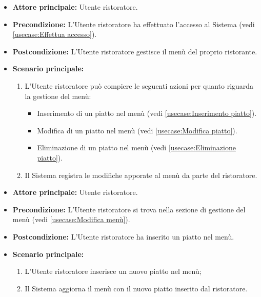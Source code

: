 \label{usecase:Modifica menù}
\begin{itemize}
	\item \textbf{Attore principale:} Utente ristoratore.

	\item \textbf{Precondizione:} L'Utente ristoratore ha effettuato l'accesso al Sistema (vedi \autoref{usecase:Effettua accesso}).

	\item \textbf{Postcondizione:} L'Utente ristoratore gestisce il menù del proprio ristorante.


	\item \textbf{Scenario principale:}
	      \begin{enumerate}

		      \item L'Utente ristoratore può compiere le seguenti azioni per quanto riguarda la gestione del menù:
		      \begin{itemize}
                \item Inserimento di un piatto nel menù (vedi \autoref{usecase:Inserimento piatto}).
                \item Modifica di un piatto nel menù (vedi \autoref{usecase:Modifica piatto}).
                \item Eliminazione di un piatto nel menù (vedi \autoref{usecase:Eliminazione piatto}).
              \end{itemize}
		      \item Il Sistema registra le modifiche apporate al menù da parte del ristoratore.

	      \end{enumerate}
\end{itemize}

\label{usecase:Inserimento piatto}
\begin{itemize}

	\item \textbf{Attore principale:} Utente ristoratore.

	\item \textbf{Precondizione:} L'Utente ristoratore si trova nella sezione di gestione del menù (vedi \autoref{usecase:Modifica menù}).

	\item \textbf{Postcondizione:} L'Utente ristoratore ha inserito un piatto nel menù.

	\item \textbf{Scenario principale:}
	\begin{enumerate}
		\item L'Utente ristoratore inserisce un nuovo piatto nel menù;
		\item Il Sistema aggiorna il menù con il nuovo piatto inserito dal ristoratore.
	\end{enumerate}

\end{itemize}


